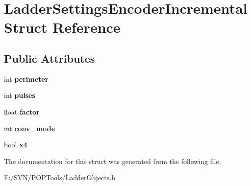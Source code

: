 \hypertarget{struct_ladder_settings_encoder_incremental}{\section{Ladder\-Settings\-Encoder\-Incremental Struct Reference}
\label{struct_ladder_settings_encoder_incremental}
}
\subsection*{Public Attributes}
\begin{DoxyCompactItemize}
\item 
\hypertarget{struct_ladder_settings_encoder_incremental_a5888efc12ab5c8de0e6c15ded131fe85}{int {\bfseries perimeter}}\label{struct_ladder_settings_encoder_incremental_a5888efc12ab5c8de0e6c15ded131fe85}

\item 
\hypertarget{struct_ladder_settings_encoder_incremental_aed62c80ac71336a9f747f6df667f92dc}{int {\bfseries pulses}}\label{struct_ladder_settings_encoder_incremental_aed62c80ac71336a9f747f6df667f92dc}

\item 
\hypertarget{struct_ladder_settings_encoder_incremental_a9824006795adc55d9a831912c0f4a355}{float {\bfseries factor}}\label{struct_ladder_settings_encoder_incremental_a9824006795adc55d9a831912c0f4a355}

\item 
\hypertarget{struct_ladder_settings_encoder_incremental_a9ddc5c419d6f0deb6d76abff56dcdb40}{int {\bfseries conv\-\_\-mode}}\label{struct_ladder_settings_encoder_incremental_a9ddc5c419d6f0deb6d76abff56dcdb40}

\item 
\hypertarget{struct_ladder_settings_encoder_incremental_ad12db99dacd902824c62bb8671f3b9a0}{bool {\bfseries x4}}\label{struct_ladder_settings_encoder_incremental_ad12db99dacd902824c62bb8671f3b9a0}

\end{DoxyCompactItemize}


The documentation for this struct was generated from the following file\-:\begin{DoxyCompactItemize}
\item 
F\-:/\-S\-V\-N/\-P\-O\-P\-Tools/Ladder\-Objects.\-h\end{DoxyCompactItemize}
